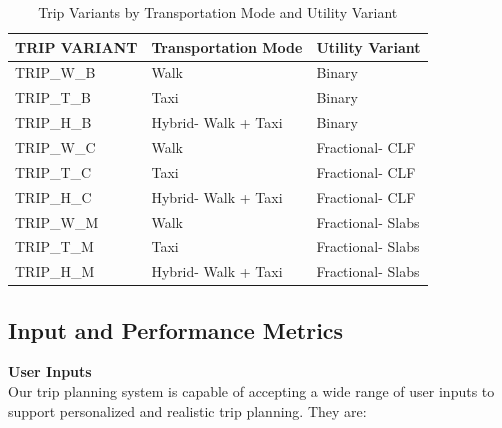 \begin{table}[H]
\centering
\begin{tabular}{|l|l|l|}
\hline
\textbf{TRIP VARIANT} & \textbf{Transportation Mode} & \textbf{Utility Variant} \\
\hline
TRIP\_W\_B & Walk & Binary \\
TRIP\_T\_B & Taxi & Binary \\
TRIP\_H\_B & Hybrid- Walk + Taxi & Binary \\
TRIP\_W\_C & Walk & Fractional- CLF \\
TRIP\_T\_C & Taxi & Fractional- CLF \\
TRIP\_H\_C & Hybrid- Walk + Taxi & Fractional- CLF \\
TRIP\_W\_M & Walk & Fractional- Slabs \\
TRIP\_T\_M & Taxi & Fractional- Slabs \\
TRIP\_H\_M & Hybrid- Walk + Taxi & Fractional- Slabs \\
\hline
\end{tabular}
\caption{Trip Variants by Transportation Mode and Utility Variant}
\label{tab:trip_variants}
\end{table}


\subsection{Input and Performance Metrics}

\textbf{User Inputs}\\
Our trip planning system is capable of accepting a wide range of user inputs to support personalized and realistic trip planning. They are:

